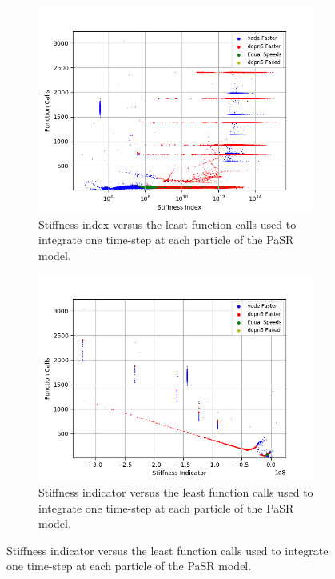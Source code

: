 \documentclass[12pt]{ussci}
\begin{document}
\begin{figure}[htbp]
\begin{subfigure}{0.43\textwidth}
        \label{fig:SRH2COPaSR}
    \end{subfigure}
    \begin{subfigure}{0.43\textwidth}
        \includegraphics[width=\linewidth]{H2_CO/PaSR_Fn_Work_Index_Groupings_1e-06.png}
        \caption{Stiffness index versus the least function calls used to integrate one time-step at each particle of the PaSR model.}
        \label{fig:SI1H2COPaSR}
    \end{subfigure}
    \hfill
    \begin{subfigure}{0.43\textwidth}
        \includegraphics[width=\linewidth]{H2_CO/PaSR_Fn_Work_Indicator_Groupings_1e-06.png}
        \caption{Stiffness indicator versus the least function calls used to integrate one time-step at each particle of the PaSR model.}

\end{subfigure}
\end{figure}
\end{document}
